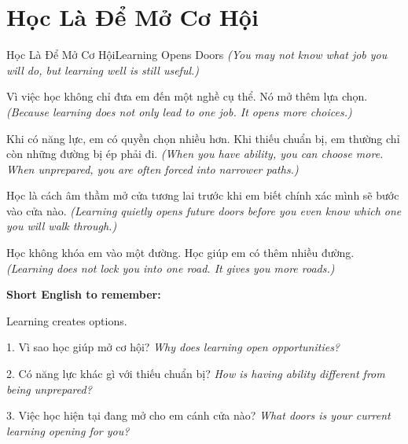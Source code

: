 \section{Học Là Để Mở Cơ Hội}
\begin{truyen}{Học Là Để Mở Cơ Hội}{Learning Opens Doors}
\textit{(You may not know what job you will do, but learning well is still useful.)}

Vì việc học không chỉ đưa em đến một nghề cụ thể. Nó mở thêm lựa chọn.
\textit{(Because learning does not only lead to one job. It opens more choices.)}

Khi có năng lực, em có quyền chọn nhiều hơn. Khi thiếu chuẩn bị, em thường chỉ còn những đường bị ép phải đi.
\textit{(When you have ability, you can choose more. When unprepared, you are often forced into narrower paths.)}

Học là cách âm thầm mở cửa tương lai trước khi em biết chính xác mình sẽ bước vào cửa nào.
\textit{(Learning quietly opens future doors before you even know which one you will walk through.)}
\end{truyen}

\begin{baihoc}
Học không khóa em vào một đường. Học giúp em có thêm nhiều đường.
\textit{(Learning does not lock you into one road. It gives you more roads.)}
\end{baihoc}

\begin{ghinhoanh}
\textbf{Short English to remember:}

Learning creates options.

\end{ghinhoanh}

\begin{tuhocnhanh}
1. Vì sao học giúp mở cơ hội? \textit{Why does learning open opportunities?}

2. Có năng lực khác gì với thiếu chuẩn bị? \textit{How is having ability different from being unprepared?}

3. Việc học hiện tại đang mở cho em cánh cửa nào? \textit{What doors is your current learning opening for you?}
\end{tuhocnhanh}
\ngancach

